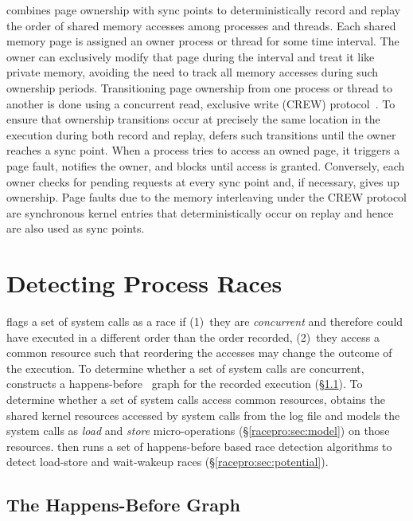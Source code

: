 \racepro combines page ownership with sync points to
deterministically record and replay the order of shared memory
accesses among processes and threads.  Each shared memory page is
assigned an owner process or thread for some time interval.  The owner
can exclusively modify that page during the interval and treat it like 
private memory, avoiding the need to track all memory accesses during such
ownership periods.  Transitioning page ownership from one process or
thread to another is done using a concurrent read, exclusive write
(CREW) protocol~\cite{smp-revirt:vee08,instant-replay}.  To ensure
that ownership transitions occur at precisely the same location 
in the execution during both record and replay, \racepro defers such
transitions until the owner reaches a sync point.  When a process
tries to access an owned page, it triggers a page fault, notifies the owner,
and blocks until access is granted.  Conversely, each owner checks for
pending requests at every sync point and, if necessary, gives up 
ownership.   Page faults due to the memory interleaving under
the CREW protocol are synchronous kernel entries that
deterministically occur on replay and hence are also used as sync 
points. 

\section{Detecting Process Races} \label{racepro:sec:detect}

\racepro flags a set of system calls as a race if (1)~they are
\emph{concurrent} and therefore could have executed in a different
order than the order recorded, (2)~they access a common resource
such that reordering the accesses may change the outcome of the
execution.  To determine whether a set of system calls are concurrent, 
\racepro constructs a happens-before~\cite{lamportclock} graph for the
recorded execution (\S\ref{racepro:sec:graph}).  To determine whether a set of
system calls access common resources, \racepro obtains the shared kernel
resources accessed by system calls from the log file and models the
system calls as \emph{load} and \emph{store} micro-operations
(\S\ref{racepro:sec:model}) on those resources.  \racepro then runs a set of
happens-before based race detection algorithms to detect load-store
and wait-wakeup races (\S\ref{racepro:sec:potential}).

\subsection{The Happens-Before Graph} \label{racepro:sec:graph}

